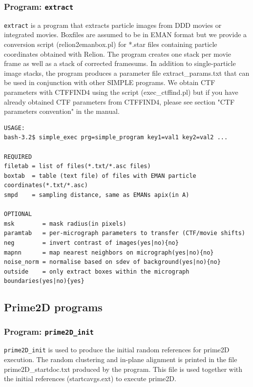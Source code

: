 \documentclass[a4paper,11pt]{article}
\newcommand{\prgname}[1]{\textcolor{NavyBlue}{\texttt{#1}}}
\begin{document}
\subsubsection{Program: \prgname{extract}}
\label{extract}
\prgname{extract} is a program that extracts particle images from DDD movies or integrated movies. Boxfiles are assumed to be in EMAN format but we provide a conversion script (relion2emanbox.pl) for *.star files containing particle coordinates obtained with Relion. The program creates one stack per movie frame as well as a stack of corrected framesums. In addition to single-particle image stacks, the program produces a parameter file extract\_params.txt that can be used in conjunction with other SIMPLE programs. We obtain CTF parameters with CTFFIND4 using the script (exec\_ctffind.pl) but if you have already obtained CTF parameters from CTFFIND4, please see section "CTF parameters convention" in the manual.

\begin{verbatim}
USAGE:
bash-3.2$ simple_exec prg=simple_program key1=val1 key2=val2 ...

REQUIRED
filetab = list of files(*.txt/*.asc files)
boxtab  = table (text file) of files with EMAN particle coordinates(*.txt/*.asc)
smpd    = sampling distance, same as EMANs apix(in A)

OPTIONAL
msk        = mask radius(in pixels)
paramtab   = per-micrograph parameters to transfer (CTF/movie shifts)
neg        = invert contrast of images(yes|no){no}
mapnn      = map nearest neighbors on micrograph(yes|no){no}
noise_norm = normalise based on sdev of background(yes|no){no}
outside    = only extract boxes within the micrograph boundaries(yes|no){yes}
\end{verbatim}

\subsection{Prime2D programs}

\subsubsection{Program: \prgname{prime2D\_init}}
\label{prime2D_init}
\prgname{prime2D\_init} is used  to produce the initial random references for prime2D execution. The random clustering and in-plane alignment is printed in the file prime2D\_startdoc.txt produced by the program. This file is used together with the initial references (startcavgs.ext) to execute prime2D.
\end{document}
